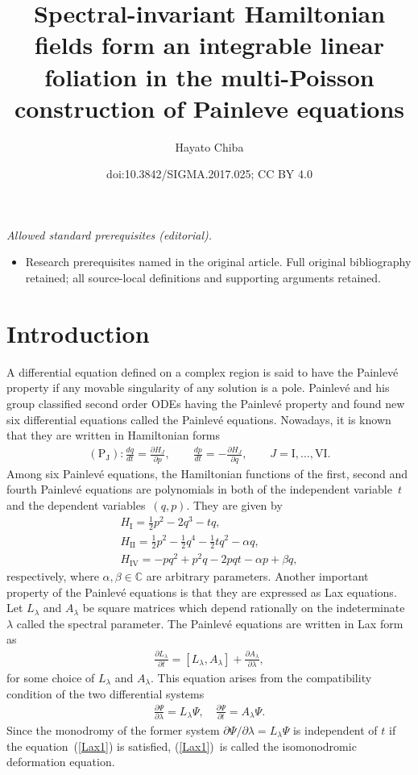 \documentclass[10pt,a4paper]{amsart}
\title{Spectral-invariant Hamiltonian fields form an integrable linear foliation in the multi-Poisson construction of Painleve equations}
\author{Hayato Chiba}
\date{doi:10.3842/SIGMA.2017.025; CC BY 4.0}
\numberwithin{equation}{section}
\begin{document}
\maketitle
\noindent\textit{Allowed standard prerequisites (editorial).}\begin{itemize}
\item Research prerequisites named in the original article. Full original bibliography retained; all source-local definitions and supporting arguments retained.
\end{itemize}\medskip
\section{Introduction}\label{section1}

A dif\/ferential equation def\/ined on a complex region is said to have the Painlev\'{e} property if any movable singularity of any solution is a pole. Painlev\'{e} and his group classif\/ied second order ODEs having the Painlev\'{e} property and found new six dif\/ferential equations called the Painlev\'{e} equations. Nowadays, it is known that they are written in Hamiltonian forms
\begin{gather*}
(\text{P}_\text{J})\colon \frac{dq}{dt} = \frac{\partial H_J}{\partial p}, \qquad
\frac{dp}{dt} = -\frac{\partial H_J}{\partial q}, \qquad J = \text{I}, \dots, \text{VI}.
\end{gather*}
Among six Painlev\'{e} equations, the Hamiltonian functions of the f\/irst, second and fourth Painlev\'{e} equations are polynomials in both of the independent variable~$t$ and the dependent variab\-les~$(q,p)$. They are given by
\begin{gather}
H_{\text{I}} = \frac{1}{2}p^2 - 2q^3 - tq, \label{2dimP1} \\
H_\text{II} = \frac{1}{2}p^2 - \frac{1}{2}q^4 - \frac{1}{2}tq^2 - \alpha q, \label{2dimP2} \\
H_\text{IV} = -pq^2 + p^2q - 2pqt - \alpha p + \beta q, \label{2dimP4}
\end{gather}
respectively, where $\alpha, \beta \in \mathbb{C}$ are arbitrary parameters. Another important property of the Painlev\'{e} equations is that they are expressed as Lax equations. Let $L_\lambda $ and $A_\lambda $ be square matrices which depend rationally on the indeterminate $\lambda $ called the spectral parameter. The Painlev\'{e} equations are written in Lax form as
\begin{gather}
\frac{\partial L_\lambda }{\partial t} = [L_\lambda , A_\lambda ] + \frac{\partial A_\lambda }{\partial \lambda },\label{Lax1}
\end{gather}
for some choice of $L_\lambda $ and $A_\lambda $. This equation arises from the compatibility condition of the two dif\/ferential systems
\begin{gather*}
\frac{\partial \Psi}{\partial \lambda } = L_\lambda \Psi, \quad \frac{\partial \Psi}{\partial t } = A_\lambda \Psi.
\end{gather*}
Since the monodromy of the former system $\partial \Psi/\partial \lambda = L_\lambda \Psi$ is independent of $t$ if the equation~(\ref{Lax1}) is satisf\/ied, (\ref{Lax1})~is called the isomonodromic deformation equation.
\end{document}
